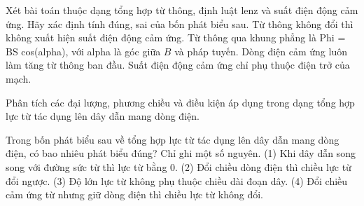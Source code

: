 \begin{ex}
Xét bài toán thuộc dạng tổng hợp từ thông, định luật lenz và suất điện động cảm ứng. Hãy xác định tính đúng, sai của bốn phát biểu sau.
\choiceTF
{\True Từ thông không đổi thì không xuất hiện suất điện động cảm ứng.}
{\True Từ thông qua khung phẳng là Phi = BS cos(alpha), với alpha là góc giữa $B$ và pháp tuyến.}
{Dòng điện cảm ứng luôn làm tăng từ thông ban đầu.}
{Suất điện động cảm ứng chỉ phụ thuộc điện trở của mạch.}
\end{ex}

\begin{bt}
Phân tích các đại lượng, phương chiều và điều kiện áp dụng trong dạng tổng hợp lực từ tác dụng lên dây dẫn mang dòng điện.
\end{bt}

\begin{ex}
Trong bốn phát biểu sau về tổng hợp lực từ tác dụng lên dây dẫn mang dòng điện, có bao nhiêu phát biểu đúng? Chỉ ghi một số nguyên. (1) Khi dây dẫn song song với đường sức từ thì lực từ bằng 0. (2) Đổi chiều dòng điện thì chiều lực từ đổi ngược. (3) Độ lớn lực từ không phụ thuộc chiều dài đoạn dây. (4) Đổi chiều cảm ứng từ nhưng giữ dòng điện thì chiều lực từ không đổi.
\end{ex}

